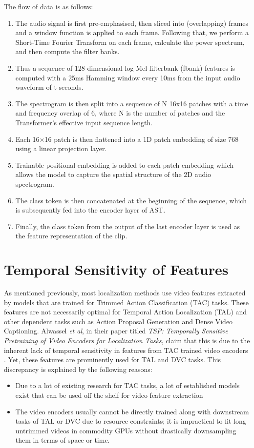 \par The flow of data is as follows:
\begin{enumerate}
	\item The audio signal is first pre-emphasised, then sliced into (overlapping) frames and a window function is applied to each frame. Following that, we perform a Short-Time Fourier Transform on each frame, calculate the power spectrum, and then compute the filter banks.
	\item Thus a sequence of 128-dimensional log Mel filterbank (fbank) features is computed with a 25ms Hamming window every 10ms from the input audio waveform of t seconds. 
	\item The spectrogram is then split into a sequence of N 16x16 patches with a time and frequency overlap of 6, where N is the number of patches and the Transformer's effective input sequence length.
	\item Each 16×16 patch is then flattened into a 1D patch embedding of size 768 using a linear projection layer. 
	\item Trainable positional embedding is added to each patch embedding which allows the model to capture the spatial structure of the 2D audio spectrogram.
	\item The class token is then concatenated at the beginning of the sequence, which is subsequently fed into the encoder layer of AST.
	\item Finally, the class token from the output of the last encoder layer is used as the feature representation of the clip.
	
\end{enumerate}
  

\section{Temporal Sensitivity of Features}
\par As mentioned previously, most localization methods use video features extracted by models that are trained for Trimmed Action Classification (TAC) tasks. These features are not necessarily optimal for Temporal Action Localization (TAL) and other dependent tasks such as Action Proposal Generation and Dense Video Captioning. Alwassel \textit{et al}, in their paper titled \textit{TSP: Temporally Sensitive Pretraining of Video Encoders for Localization Tasks}, claim that this is due to the inherent lack of temporal sensitivity in features from TAC trained video encoders \cite{alwassel2021tsp}. Yet, these features are prominently used for TAL and DVC tasks. This discrepancy is explained by the following reasons:
\begin{itemize}
	\item Due to a lot of existing research for TAC tasks, a lot of established models exist that can be used off the shelf for video feature extraction
	\item The video encoders usually cannot be directly trained along with downstream tasks of TAL or DVC due to resource constraints; it is impractical to fit long untrimmed videos in commodity GPUs without drastically downsampling them in terms of space or time.
\end{itemize}

